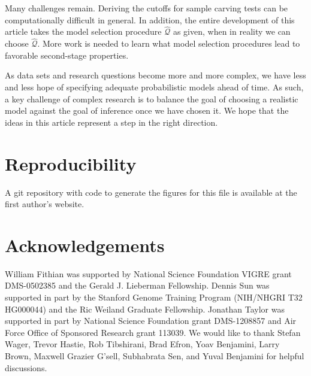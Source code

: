 \documentclass{article}
\theoremstyle{definition}
\newcommand{\hcQ}{\widehat{\mathcal{Q}}}
\begin{document}
Many challenges remain. Deriving the cutoffs for sample carving tests can be computationally difficult in general. In addition, the entire development of this article takes the model selection procedure $\hcQ$ as given, when in reality we can choose $\hcQ$. More work is needed to learn what model selection procedures lead to favorable second-stage properties.

As data sets and research questions become more and more complex, we have less and less hope of specifying  adequate probabilistic models ahead of time. As such, a key challenge of complex research is to balance the goal of choosing a realistic model against the goal of inference once we have chosen it. We hope that the ideas in this article represent a step in the right direction.

\section*{Reproducibility}

A git repository with code to generate the figures for this file is available at the first author's website.

\section*{Acknowledgements}
William Fithian was supported by National Science Foundation VIGRE grant DMS-0502385 and the Gerald J. Lieberman Fellowship.
Dennis Sun was supported in part by the Stanford Genome Training Program (NIH/NHGRI T32 HG000044) and the Ric Weiland Graduate Fellowship.
Jonathan Taylor was supported in part by National Science Foundation grant DMS-1208857 and
Air Force Office of Sponsored Research grant 113039.
We would like to thank Stefan Wager, Trevor Hastie, Rob Tibshirani, Brad Efron, Yoav Benjamini, Larry Brown, Maxwell Grazier G'sell, Subhabrata Sen, and Yuval Benjamini for helpful discussions.



\end{document}
